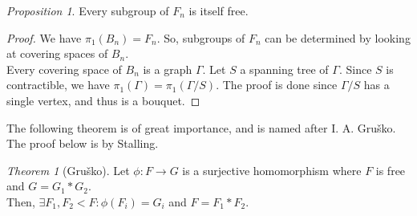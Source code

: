 \documentclass[11pt]{article}
\theoremstyle{definition}
\theoremstyle{example}
\theoremstyle{remark}
\theoremstyle{lemma}
\theoremstyle{proposition}
\newtheorem{proposition}{Proposition}[section]
\theoremstyle{Problem}
\theoremstyle{Solution}
\theoremstyle{theorem}
\newtheorem{theorem}{Theorem}[section]
\theoremstyle{corollary}
\begin{document}
\begin{proposition}
Every subgroup of $F_n$ is itself free.
\end{proposition}
\begin{proof}
We have $\pi_1(B_n) = F_n$. So, subgroups of $F_n$ can be determined by looking at covering spaces of $B_n$.\\
Every covering space of $B_n$ is a graph $\Gamma$. Let $S$ a spanning tree of $\Gamma$. Since $S$ is contractible, we have $\pi_1(\Gamma) = \pi_1(\Gamma/S)$. The proof is done since $\Gamma/S$ has a single vertex, and thus is a bouquet. 
\end{proof}

The following theorem is of great importance, and is named after I. A. Gru\v{s}ko. The proof below is by Stalling.
\begin{theorem}[Gru\v{s}ko]
Let $\phi: F \to G$ is a surjective homomorphism where $F$ is free and $G = G_1 * G_2$.\\
Then, $\exists F_1, F_2 < F : \phi(F_i) = G_i$ and $F = F_1 * F_2$.
\end{theorem}
\end{document}
